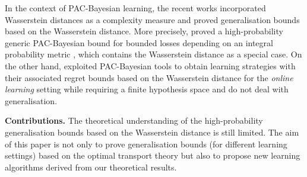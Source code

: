 In the context of PAC-Bayesian learning, the recent works \cite{amit2022integral,chee2021learning} incorporated Wasserstein distances as a complexity measure and proved generalisation bounds based on the Wasserstein distance.
More precisely, \cite{amit2022integral} proved a high-probability generic PAC-Bayesian bound for bounded losses depending on an integral probability metric \citep{muller1997integral}, which contains the Wasserstein distance as a special case. 
On the other hand, \cite{chee2021learning} exploited PAC-Bayesian tools to obtain learning strategies with their associated regret bounds based on the Wasserstein distance for the \emph{online learning} setting while requiring a finite hypothesis space and do not deal with generalisation.

\textbf{Contributions.}
The theoretical understanding of the high-probability generalisation bounds based on the Wasserstein distance is still limited.
The aim of this paper is not only to prove generalisation bounds (for different learning settings) based on the optimal transport theory but also to propose new learning algorithms derived from our theoretical results.
